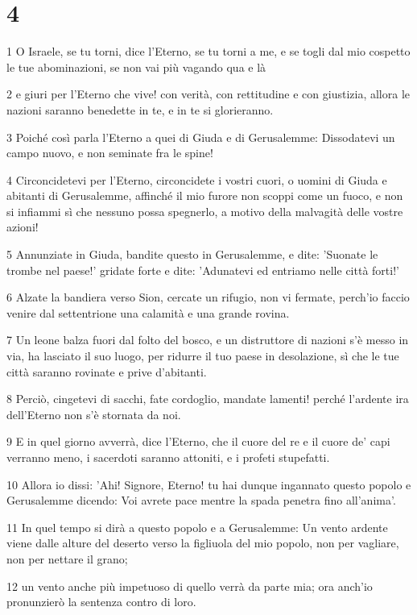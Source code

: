 \chapter{4}

\par 1 O Israele, se tu torni, dice l'Eterno, se tu torni a me, e se togli dal mio cospetto le tue abominazioni, se non vai più vagando qua e là
\par 2 e giuri per l'Eterno che vive! con verità, con rettitudine e con giustizia, allora le nazioni saranno benedette in te, e in te si glorieranno.
\par 3 Poiché così parla l'Eterno a quei di Giuda e di Gerusalemme: Dissodatevi un campo nuovo, e non seminate fra le spine!
\par 4 Circoncidetevi per l'Eterno, circoncidete i vostri cuori, o uomini di Giuda e abitanti di Gerusalemme, affinché il mio furore non scoppi come un fuoco, e non si infiammi sì che nessuno possa spegnerlo, a motivo della malvagità delle vostre azioni!
\par 5 Annunziate in Giuda, bandite questo in Gerusalemme, e dite: 'Suonate le trombe nel paese!' gridate forte e dite: 'Adunatevi ed entriamo nelle città forti!'
\par 6 Alzate la bandiera verso Sion, cercate un rifugio, non vi fermate, perch'io faccio venire dal settentrione una calamità e una grande rovina.
\par 7 Un leone balza fuori dal folto del bosco, e un distruttore di nazioni s'è messo in via, ha lasciato il suo luogo, per ridurre il tuo paese in desolazione, sì che le tue città saranno rovinate e prive d'abitanti.
\par 8 Perciò, cingetevi di sacchi, fate cordoglio, mandate lamenti! perché l'ardente ira dell'Eterno non s'è stornata da noi.
\par 9 E in quel giorno avverrà, dice l'Eterno, che il cuore del re e il cuore de' capi verranno meno, i sacerdoti saranno attoniti, e i profeti stupefatti.
\par 10 Allora io dissi: 'Ahi! Signore, Eterno! tu hai dunque ingannato questo popolo e Gerusalemme dicendo: Voi avrete pace mentre la spada penetra fino all'anima'.
\par 11 In quel tempo si dirà a questo popolo e a Gerusalemme: Un vento ardente viene dalle alture del deserto verso la figliuola del mio popolo, non per vagliare, non per nettare il grano;
\par 12 un vento anche più impetuoso di quello verrà da parte mia; ora anch'io pronunzierò la sentenza contro di loro.
